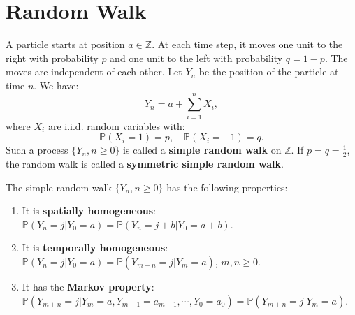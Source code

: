 \documentclass{huhtakm-template-book-v2}
\newcommand{\prob}{\mathbb{P}}
\begin{document}
\appendix
\renewcommand{\thechapter}{\Alph{chapter}}

\chapter{Random Walk}
    \label{Appendix A (Random Walk)}
    \begin{eg}
        A particle starts at position $a \in \mathbb{Z}$. At each time step, it moves one unit to the right with probability $p$ and one unit to the left with probability $q = 1-p$. The moves are independent of each other. Let $Y_{n}$ be the position of the particle at time $n$. We have:
        \begin{equation*}
            Y_{n} = a+\sum_{i = 1}^{n}X_{i},
        \end{equation*}
        where $X_{i}$ are i.i.d. random variables with:
        \begin{equation*}
            \prob(X_{i} = 1) = p, \quad \prob(X_{i} = -1) = q.
        \end{equation*}
        Such a process $\{Y_{n},n \geq 0\}$ is called a \textbf{simple random walk} on $\mathbb{Z}$. If $p = q = \frac{1}{2}$, the random walk is called a \textbf{symmetric simple random walk}.
    \end{eg}
    \begin{lem}
        \label{Appendix A (Lemma) Simple random walk properties}
        The simple random walk $\{Y_{n},n \geq 0\}$ has the following properties:
        \begin{enumerate}
            \item It is \textbf{spatially homogeneous}: $\prob(Y_{n} = j|Y_{0} = a) = \prob(Y_{n} = j+b|Y_{0} = a+b)$.
            \item It is \textbf{temporally homogeneous}: $\prob(Y_{n} = j|Y_{0} = a) = \prob(Y_{m+n} = j|Y_{m} = a)$, $m,n \geq 0$.
            \item It has the \textbf{Markov property}: $\prob(Y_{m+n} = j|Y_{m} = a,Y_{m-1} = a_{m-1},\cdots,Y_{0} = a_{0}) = \prob(Y_{m+n} = j|Y_{m} = a)$.
        \end{enumerate}
    \end{lem}
\end{document}
